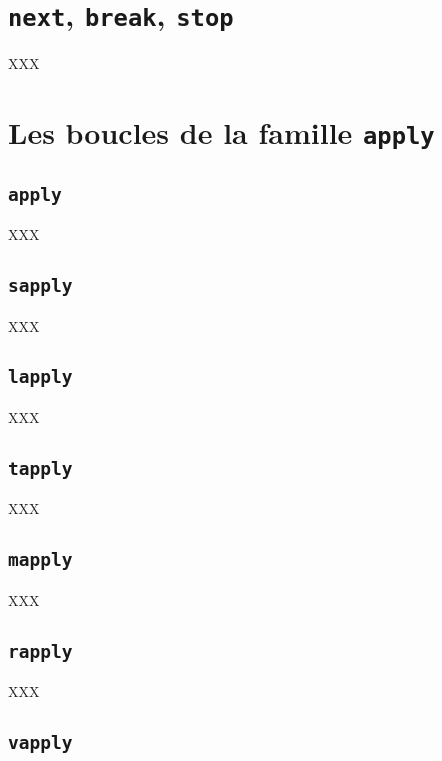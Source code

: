 \documentclass[]{book}
\theoremstyle{definition}
\theoremstyle{definition}
\theoremstyle{definition}
\theoremstyle{remark}
\begin{document}
\section{\texorpdfstring{\texttt{next}, \texttt{break},
\texttt{stop}}{next, break, stop}}\label{l17spe}

XXX

\section{\texorpdfstring{Les boucles de la famille
\texttt{apply}}{Les boucles de la famille apply}}\label{l17applyfamily}

\subsection{\texorpdfstring{\texttt{apply}}{apply}}\label{l17apply}

XXX

\subsection{\texorpdfstring{\texttt{sapply}}{sapply}}\label{l17sapply}

XXX

\subsection{\texorpdfstring{\texttt{lapply}}{lapply}}\label{l17lapply}

XXX

\subsection{\texorpdfstring{\texttt{tapply}}{tapply}}\label{l17tapply}

XXX

\subsection{\texorpdfstring{\texttt{mapply}}{mapply}}\label{l17mapply}

XXX

\subsection{\texorpdfstring{\texttt{rapply}}{rapply}}\label{l17rapply}

XXX

\subsection{\texorpdfstring{\texttt{vapply}}{vapply}}\label{l17vapply}
\end{document}
